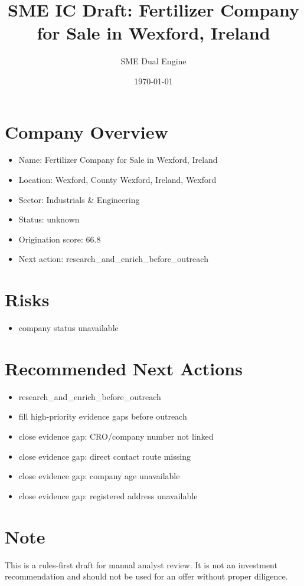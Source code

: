 \documentclass[11pt,a4paper]{article}
\title{SME IC Draft: Fertilizer Company for Sale in Wexford, Ireland}
\author{SME Dual Engine}
\date{\today}
\begin{document}
\maketitle
\section*{Company Overview}
\begin{itemize}[leftmargin=1.4em]
\item Name: Fertilizer Company for Sale in Wexford, Ireland
\item Location: Wexford, County Wexford, Ireland, Wexford
\item Sector: Industrials \& Engineering
\item Status: unknown
\item Origination score: 66.8
\item Next action: research\_and\_enrich\_before\_outreach
\end{itemize}
\section*{Risks}
\begin{itemize}[leftmargin=1.4em]
\item company status unavailable
\end{itemize}
\section*{Recommended Next Actions}
\begin{itemize}[leftmargin=1.4em]
\item research\_and\_enrich\_before\_outreach
\item fill high-priority evidence gaps before outreach
\item close evidence gap: CRO/company number not linked
\item close evidence gap: direct contact route missing
\item close evidence gap: company age unavailable
\item close evidence gap: registered address unavailable
\end{itemize}
\section*{Note}
This is a rules-first draft for manual analyst review. It is not an investment
recommendation and should not be used for an offer without proper diligence.
\end{document}

